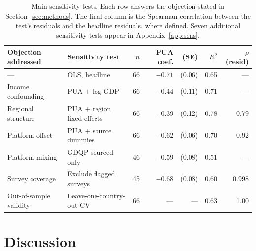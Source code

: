 \documentclass[11pt]{article}
\begin{document}
\begin{table}[tbp]
\centering\small
\caption{Main sensitivity tests. Each row answers the objection stated in Section~\ref{sec:methods}. The final column is the Spearman correlation between the test's residuals and the headline residuals, where defined. Seven additional sensitivity tests appear in Appendix~\ref{app:sens}.}
\label{tab:robust}
\begin{tabular}{llrrrrr}
\toprule
Objection addressed & Sensitivity test & $n$ & PUA coef. & (SE) & $R^2$ & $\rho$(resid)\\
\midrule
--- & OLS, headline & 66 & $-0.71$ & (0.06) & 0.65 & ---\\
Income confounding & PUA $+$ log GDP & 66 & $-0.44$ & (0.11) & 0.71 & ---\\
Regional structure & PUA $+$ region fixed effects & 66 & $-0.39$ & (0.12) & 0.78 & 0.79\\
Platform offset & PUA $+$ source dummies & 66 & $-0.62$ & (0.06) & 0.70 & 0.92\\
Platform mixing & GDQP-sourced only & 46 & $-0.59$ & (0.08) & 0.51 & ---\\
Survey coverage & Exclude flagged surveys & 45 & $-0.68$ & (0.08) & 0.60 & 0.998\\
Out-of-sample validity & Leave-one-country-out CV & 66 & --- & --- & 0.63 & 1.00\\
\bottomrule
\end{tabular}
\end{table}

\section{Discussion}\label{sec:discussion}
\end{document}
